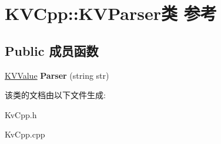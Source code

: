 \hypertarget{class_k_v_cpp_1_1_k_v_parser}{}\section{K\+V\+Cpp\+:\+:K\+V\+Parser类 参考}
\label{class_k_v_cpp_1_1_k_v_parser}
\subsection*{Public 成员函数}
\begin{DoxyCompactItemize}
\item 
\hypertarget{class_k_v_cpp_1_1_k_v_parser_ada190d89e929a34ef7dd42f31d4c9a40}{}\hyperlink{class_k_v_cpp_1_1_k_v_value}{K\+V\+Value} {\bfseries Parser} (string str)\label{class_k_v_cpp_1_1_k_v_parser_ada190d89e929a34ef7dd42f31d4c9a40}

\end{DoxyCompactItemize}


该类的文档由以下文件生成\+:\begin{DoxyCompactItemize}
\item 
Kv\+Cpp.\+h\item 
Kv\+Cpp.\+cpp\end{DoxyCompactItemize}

